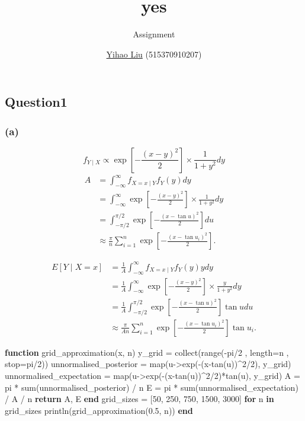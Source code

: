 \documentclass[]{article}
\title{yes}
\author{}
\date{}
\subtitle{Assignment}
\author{\href{mailto:liuyh615@sjtu.edu.cn}{Yihao Liu} (515370910207)}
\newenvironment{Shaded}{\begin{snugshade}}{\end{snugshade}}
\newcommand{\KeywordTok}[1]{\textcolor[rgb]{0.13,0.29,0.53}{\textbf{#1}}}
\newcommand{\FloatTok}[1]{\textcolor[rgb]{0.00,0.00,0.81}{#1}}
\newcommand{\NormalTok}[1]{#1}
\begin{document}
\maketitle

\subsection{Question1}\label{question1}

\subsubsection{(a)}\label{a}

\[f_{Y\mid X}\propto \exp\left[-\frac{(x-y)^2}{2}\right]\times\frac{1}{1+y^2}dy\]
\[\begin{aligned}A&=\int_{-\infty}^\infty f_{X=x\mid Y}f_Y(y)dy \\&= \int_{-\infty}^\infty\exp\left[-\frac{(x-y)^2}{2}\right]\times\frac{1}{1+y^2}dy\\&=\int_{-\pi/2}^{\pi/2}\exp\left[-\frac{(x-\tan u)^2}{2}\right]du\\&\approx \frac{\pi}{n}\sum_{i=1}^n \exp\left[-\frac{(x-\tan u_i)^2}{2}\right].\end{aligned}\]

\[\begin{aligned}E[Y\mid X=x]&=\frac{1}{A}\int_{-\infty}^\infty f_{X=x\mid Y}f_Y(y)ydy\\&=\frac{1}{A}\int_{-\infty}^\infty\exp\left[-\frac{(x-y)^2}{2}\right]\times\frac{y}{1+y^2}dy\\&=\frac{1}{A}\int_{-\pi/2}^{\pi/2}\exp\left[-\frac{(x-\tan u)^2}{2}\right]\tan udu\\&\approx \frac{\pi}{An}\sum_{i=1}^n \exp\left[-\frac{(x-\tan u_i)^2}{2}\right]\tan u_i.\end{aligned}\]

\begin{Shaded}
\begin{Highlighting}[]
\KeywordTok{function}\NormalTok{ grid_approximation(x, n)}
\NormalTok{  y_grid = collect(range(-pi/}\FloatTok{2}\NormalTok{ , length=n , stop=pi/}\FloatTok{2}\NormalTok{))}
\NormalTok{  unnormalised_posterior = map(u->exp(-(x-tan(u))^}\FloatTok{2}\NormalTok{/}\FloatTok{2}\NormalTok{), y_grid)}
\NormalTok{  unnormalised_expectation = map(u->exp(-(x-tan(u))^}\FloatTok{2}\NormalTok{/}\FloatTok{2}\NormalTok{)*tan(u), y_grid)}
\NormalTok{  A = pi * sum(unnormalised_posterior) / n}
\NormalTok{  E = pi * sum(unnormalised_expectation) / A / n}
  \KeywordTok{return}\NormalTok{ A, E}
\KeywordTok{end}
\NormalTok{grid_sizes = [}\FloatTok{50}\NormalTok{, }\FloatTok{250}\NormalTok{, }\FloatTok{750}\NormalTok{, }\FloatTok{1500}\NormalTok{, }\FloatTok{3000}\NormalTok{]}
\KeywordTok{for}\NormalTok{ n }\KeywordTok{in}\NormalTok{ grid_sizes}
\NormalTok{  println(grid_approximation(}\FloatTok{0.5}\NormalTok{, n))}
\KeywordTok{end}
\end{Highlighting}
\end{Shaded}
\end{document}
